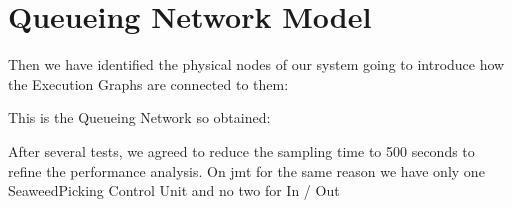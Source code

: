 \newpage \chapter{\textbf{Queueing Network Model}}

Then we have identified the physical nodes of our system going to introduce how the Execution Graphs are connected to them:
\bigskip
\bigskip
\bigskip
\bigskip
\begin{center}
\end{center}
\bigskip
{}

\newpage
This is the Queueing Network so obtained:
\bigskip
\bigskip
\begin{center}
\end{center}
\bigskip
{}

\bigskip
After several tests, we agreed to reduce the sampling time to 500 seconds to refine the performance analysis. On jmt for the same reason we have only one SeaweedPicking Control Unit and no two for In / Out